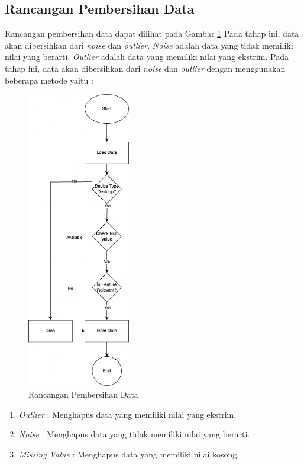 \subsection{Rancangan Pembersihan Data}
Rancangan pembersihan data dapat dilihat pada Gambar \ref{fig:pembersihan-data} Pada tahap ini, data akan dibersihkan dari \textit{noise} dan \textit{outlier}. \textit{Noise} adalah data yang tidak memiliki nilai yang berarti. \textit{Outlier} adalah data yang memiliki nilai yang ekstrim. Pada tahap ini, data akan dibersihkan dari \textit{noise} dan \textit{outlier} dengan menggunakan beberapa metode yaitu :

\begin{figure}[H]
    \centering
    \includegraphics[width=0.4\textwidth]{contents/chapter-4/pre-processing.png}
    \caption{Rancangan Pembersihan Data}
    \label{fig:pembersihan-data}
\end{figure}

\begin{enumerate}
    \item \textit{Outlier} : Menghapus data yang memiliki nilai yang ekstrim.
    \item \textit{Noise} : Menghapus data yang tidak memiliki nilai yang berarti.
    \item \textit{Missing Value} : Menghapus data yang memiliki nilai kosong.
\end{enumerate}

